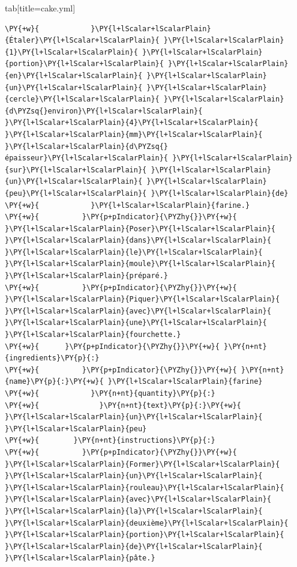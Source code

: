 \documentclass[a4paper,twoside]{article}
\begin{document}
\begin{tsdiv}{tab}[title=cake.yml]
\begin{tscode}[lang=yaml, engine=pygments]
\begin{Verbatim}[commandchars=\\\{\},breaklines, breakanywhere, commandchars=\\\{\}]
\PY{+w}{            }\PY{l+lScalar+lScalarPlain}{Étaler}\PY{l+lScalar+lScalarPlain}{ }\PY{l+lScalar+lScalarPlain}{1}\PY{l+lScalar+lScalarPlain}{ }\PY{l+lScalar+lScalarPlain}{portion}\PY{l+lScalar+lScalarPlain}{ }\PY{l+lScalar+lScalarPlain}{en}\PY{l+lScalar+lScalarPlain}{ }\PY{l+lScalar+lScalarPlain}{un}\PY{l+lScalar+lScalarPlain}{ }\PY{l+lScalar+lScalarPlain}{cercle}\PY{l+lScalar+lScalarPlain}{ }\PY{l+lScalar+lScalarPlain}{d\PYZsq{}environ}\PY{l+lScalar+lScalarPlain}{ }\PY{l+lScalar+lScalarPlain}{4}\PY{l+lScalar+lScalarPlain}{ }\PY{l+lScalar+lScalarPlain}{mm}\PY{l+lScalar+lScalarPlain}{ }\PY{l+lScalar+lScalarPlain}{d\PYZsq{}épaisseur}\PY{l+lScalar+lScalarPlain}{ }\PY{l+lScalar+lScalarPlain}{sur}\PY{l+lScalar+lScalarPlain}{ }\PY{l+lScalar+lScalarPlain}{un}\PY{l+lScalar+lScalarPlain}{ }\PY{l+lScalar+lScalarPlain}{peu}\PY{l+lScalar+lScalarPlain}{ }\PY{l+lScalar+lScalarPlain}{de}
\PY{+w}{            }\PY{l+lScalar+lScalarPlain}{farine.}
\PY{+w}{          }\PY{p+pIndicator}{\PYZhy{}}\PY{+w}{ }\PY{l+lScalar+lScalarPlain}{Poser}\PY{l+lScalar+lScalarPlain}{ }\PY{l+lScalar+lScalarPlain}{dans}\PY{l+lScalar+lScalarPlain}{ }\PY{l+lScalar+lScalarPlain}{le}\PY{l+lScalar+lScalarPlain}{ }\PY{l+lScalar+lScalarPlain}{moule}\PY{l+lScalar+lScalarPlain}{ }\PY{l+lScalar+lScalarPlain}{préparé.}
\PY{+w}{          }\PY{p+pIndicator}{\PYZhy{}}\PY{+w}{ }\PY{l+lScalar+lScalarPlain}{Piquer}\PY{l+lScalar+lScalarPlain}{ }\PY{l+lScalar+lScalarPlain}{avec}\PY{l+lScalar+lScalarPlain}{ }\PY{l+lScalar+lScalarPlain}{une}\PY{l+lScalar+lScalarPlain}{ }\PY{l+lScalar+lScalarPlain}{fourchette.}
\PY{+w}{      }\PY{p+pIndicator}{\PYZhy{}}\PY{+w}{ }\PY{n+nt}{ingredients}\PY{p}{:}
\PY{+w}{          }\PY{p+pIndicator}{\PYZhy{}}\PY{+w}{ }\PY{n+nt}{name}\PY{p}{:}\PY{+w}{ }\PY{l+lScalar+lScalarPlain}{farine}
\PY{+w}{            }\PY{n+nt}{quantity}\PY{p}{:}
\PY{+w}{              }\PY{n+nt}{text}\PY{p}{:}\PY{+w}{ }\PY{l+lScalar+lScalarPlain}{un}\PY{l+lScalar+lScalarPlain}{ }\PY{l+lScalar+lScalarPlain}{peu}
\PY{+w}{        }\PY{n+nt}{instructions}\PY{p}{:}
\PY{+w}{          }\PY{p+pIndicator}{\PYZhy{}}\PY{+w}{ }\PY{l+lScalar+lScalarPlain}{Former}\PY{l+lScalar+lScalarPlain}{ }\PY{l+lScalar+lScalarPlain}{un}\PY{l+lScalar+lScalarPlain}{ }\PY{l+lScalar+lScalarPlain}{rouleau}\PY{l+lScalar+lScalarPlain}{ }\PY{l+lScalar+lScalarPlain}{avec}\PY{l+lScalar+lScalarPlain}{ }\PY{l+lScalar+lScalarPlain}{la}\PY{l+lScalar+lScalarPlain}{ }\PY{l+lScalar+lScalarPlain}{deuxième}\PY{l+lScalar+lScalarPlain}{ }\PY{l+lScalar+lScalarPlain}{portion}\PY{l+lScalar+lScalarPlain}{ }\PY{l+lScalar+lScalarPlain}{de}\PY{l+lScalar+lScalarPlain}{ }\PY{l+lScalar+lScalarPlain}{pâte.}

\end{Verbatim}
\end{tscode}
\end{tsdiv}
\end{document}
